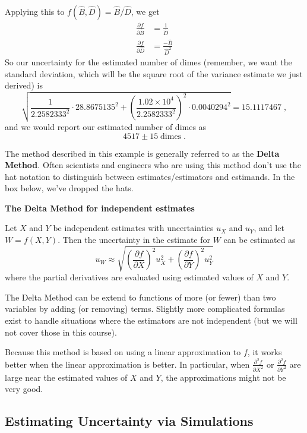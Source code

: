 \documentclass[twoside]{book}\usepackage[]{graphicx}\usepackage[]{xcolor}
\def\myindex#1{\index{#1}}
\def\term#1{\textbf{#1}}
\newlength{\tempfmlength}
\newenvironment{fmpage}[1]
     {
	 \medskip
	 \setlength{\tempfmlength}{#1}
	 \begin{lrbox}{\fmbox}
	   \begin{minipage}{#1}
		 \vspace*{.02\tempfmlength}
		 \hfill
	   \begin{minipage}{.95 \tempfmlength}}
		 {\end{minipage}\hfill
		 \vspace*{.015\tempfmlength}
		 \end{minipage}\end{lrbox}\fbox{\usebox{\fmbox}}
	 \medskip
	 }
\newenvironment{boxedText}[1][.98\textwidth]%
{%
\begin{center}
\begin{fmpage}{#1}
}%
{%
\end{fmpage}
\end{center}
}
\newcounter{example}[section]
\begin{document}
Applying this to $f(\hat B,\hat D) = \hat B/\hat D$, we get
\begin{align*}
	\frac{\partial f}{\partial \hat B} &= \frac{1}{\hat D}
	\\
	\frac{\partial f}{\partial \hat D} &= \frac{-\hat B}{\hat D^2}
\end{align*}
So our uncertainty for the estimated number of dimes (remember, we want the standard deviation, which will be the square root of the variance estimate we just derived) is
\[
\sqrt{
\frac{1}{2.2582333^2} \cdot 28.8675135^2 
+ \left(\frac{\ensuremath{1.02\times 10^{4}}}{2.2582333^2}\right)^2 \cdot 0.0040294^2}
=
15.1117467 \;,
\]
and we would report our estimated number of dimes as 
\[ 
4517 \pm 15 \; \mbox{dimes} \;.
\]

\myindex{Delta Method|defidx}%
The method described in this example is generally referred to as the
\term{Delta Method}.  Often scientists and engineers who are using this method don't use the hat notation
to distinguish between estimates/estimators and estimands.  In the box below, we've 
dropped the hats.

\begin{boxedText}
	\centerline{\textsf{\bfseries The Delta Method for independent estimates}}

	\medskip

	Let $X$ and $Y$ be independent estimates with uncertainties $u_{X}$ and $u_{Y}$,  
	and let $W = f(X,Y)$.
	Then the uncertainty in the estimate for $W$ can be estimated as 
	\[
	u_{W} \approx
	\sqrt{ 
\left(\frac{\partial f}{\partial X}\right)^2 u_X^2
+
\left(\frac{\partial f}{\partial Y}\right)^2 u_Y^2
	}
	\]
	where the partial derivatives are evaluated using estimated values of $X$ and $Y$.

	\medskip

	The Delta Method can be extend to functions of more (or fewer) than two variables by
	adding (or removing) terms.  Slightly more complicated formulas exist to handle
	situations where the estimators are not independent (but we will not cover those in this course).

	\medskip
	Because this method is based on using a linear approximation to $f$, it works better
	when the linear approximation is better.  In particular, when
	$\frac{\partial^2 f}{\partial X^2}$ or
	$\frac{\partial^2 f}{\partial Y^2}$ are large near the estimated 
	values of $X$ and $Y$, the approximations might not be very good.
\end{boxedText}

\subsection{Estimating Uncertainty via Simulations}
\end{document}
